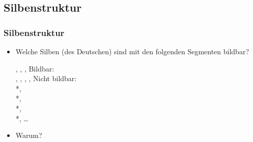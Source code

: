 \subsection{Silbenstruktur}
%
\begin{frame}
\frametitle{Silbenstruktur}

\begin{itemize}
	\item Welche Silben (des Deutschen) sind mit den folgenden Segmenten bildbar?
	
	  \ea
          \textipa{[p]}, \textipa{[a]}, \textipa{[l]}, \textipa{[t]}
          \z
\pause	
\eal
\ex Bildbar:\\
	\textipa{[palt]}, \textipa{[alpt]}, \textipa{[lapt]}, \textipa{[talp]}, \textipa{[plat]}
\ex Nicht bildbar:\\
	*\textipa{[ltap]}, \\
	*\textipa{[lpat]},\\
	*\textipa{[ptla]}, \\
	*\textipa{[tpal]}, \ldots \\
\zl
\pause
	\item Warum?
\end{itemize}

\end{frame}



